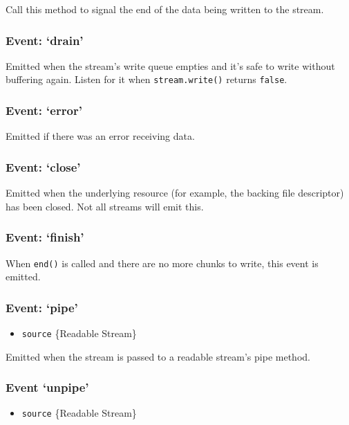 Call this method to signal the end of the data being written to the
stream.

\subsubsection{Event: `drain'}

Emitted when the stream's write queue empties and it's safe to write
without buffering again. Listen for it when \texttt{stream.write()}
returns \texttt{false}.

\subsubsection{Event: `error'}

Emitted if there was an error receiving data.

\subsubsection{Event: `close'}

Emitted when the underlying resource (for example, the backing file
descriptor) has been closed. Not all streams will emit this.

\subsubsection{Event: `finish'}

When \texttt{end()} is called and there are no more chunks to write,
this event is emitted.

\subsubsection{Event: `pipe'}

\begin{itemize}
\item
  \texttt{source} \{Readable Stream\}
\end{itemize}

Emitted when the stream is passed to a readable stream's pipe method.

\subsubsection{Event `unpipe'}

\begin{itemize}
\item
  \texttt{source} \{Readable Stream\}
\end{itemize}

